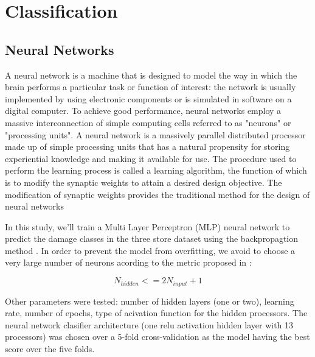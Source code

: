 \documentclass[twocolumn]{article}
\begin{document}

\section{Classification}



\subsection{Neural Networks}

A neural network is a machine that is designed to model the way in which the brain performs a particular task or function of interest: the network is usually implemented by using electronic components or is simulated in software on a digital computer. To achieve good performance, neural networks employ a massive interconnection of simple computing cells referred to as "neurons" or "processing units". A neural network is a massively parallel distributed processor made up of simple processing units that has a natural propensity for storing experiential knowledge and making it available for use. The procedure used to perform the learning process is called a learning algorithm, the function of which is to modify the synaptic weights to attain a desired design objective. The modification of synaptic weights provides the traditional method for the design of neural networks \cite{haykin2}

In this study, we'll train a Multi Layer Perceptron (MLP) neural network to predict the damage classes in the three store dataset using the backpropagtion method \cite{haykin2}. In order to prevent the model from overfitting, we avoid to choose a very large number of neurons acording to the metric proposed in \cite{HECHTNIELSEN199265}:

\[N_{hidden} <= 2N_{input} + 1\]

Other parameters were tested: number of hidden layers (one or two), learning rate, number of epochs, type of acivation function for the hidden processors. The neural network clasifier architecture (one relu activation hidden layer with 13 processors) was chosen over a 5-fold cross-validation as the model having the best score over the five folds.
\end{document}
